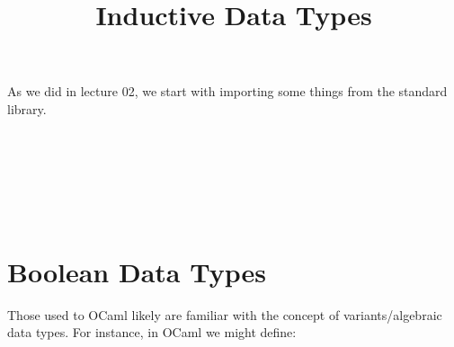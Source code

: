 \documentclass{lecturenotes}
\title{Inductive Data Types}
\begin{document}
\maketitle

As we did in lecture 02, we start with importing some things from the standard library. 

\begin{center}
    \begin{code}%
%
\>[8]\AgdaSpace{}%
\AgdaSpace{}%
\<%
\\
\>[0]\<%
\\
%
\>[8]\AgdaSpace{}%
\AgdaSpace{}%
\AgdaSpace{}%
\<%
\\
%
\>[8]\AgdaSpace{}%
\AgdaSpace{}%
\AgdaSpace{}%
\AgdaSymbol{(}\AgdaSymbol{;}\AgdaSpace{}%
\AgdaSymbol{;}\AgdaSpace{}%
\AgdaSymbol{;}\AgdaSpace{}%
\AgdaSymbol{)}\<%
\\
%
\>[8]\AgdaSpace{}%
\AgdaSpace{}%
\AgdaSpace{}%
\AgdaSymbol{(}\AgdaSymbol{;}\AgdaSpace{}%
\AgdaSymbol{;}\AgdaSpace{}%
\AgdaSymbol{;}\AgdaSpace{}%
\AgdaSymbol{)}\<%
\\
%
\>[8]\AgdaSpace{}%
\AgdaSpace{}%
\AgdaSpace{}%
\AgdaSpace{}%
\AgdaSymbol{(}\AgdaSymbol{;}\AgdaOperator{\AgdaPrimitive{\AgdaUnderscore{}+\AgdaUnderscore{}}}\AgdaSymbol{;}\AgdaOperator{\AgdaPrimitive{\AgdaUnderscore{}*\AgdaUnderscore{}}}\AgdaSymbol{;}\AgdaSymbol{;}\AgdaSymbol{)}\<%
\end{code}
\end{center}


\section{Boolean Data Types}
\label{sec:boolean-data-types}

Those used to OCaml likely are familiar with the concept of variants/algebraic data types.
For instance, in OCaml we might define:
\end{document}
